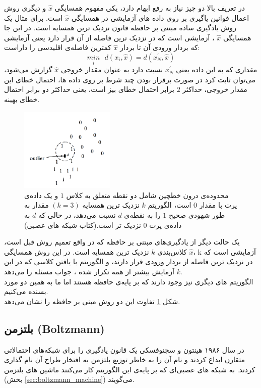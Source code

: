 \documentclass[11pt,a4paper,twocolumn]{article}
\begin{document}
در تعریف بالا دو چیز نیاز به رفع ابهام دارد، یکی مفهوم همسایگی
$\widehat x$
و دیگری روش اعمال قوانین یاگیری بر روی داده های آزمایشی در همسایگی
$\widehat x$
است. برای مثال یک روش یادگیری ساده مبتنی بر حافظه
قانون نزدیک ترین همسایه
است. در این جا همسایگی
$\widehat x$
، آزمایشی است که در نزدیک ترین فاصله از آن قرار دارد یعنی آزمایشی که بردار ورودی آن تا بردار
$\widehat x$
کمترین فاصله‌ی اقلیدسی را داراست:
$$\underset{i}{min} \text{ } d(x_i,\widehat x) = d(x_N^{'},\widehat x)$$
مقداری که به این داده یعنی
$x_N^{'}$
نسبت دارد به عنوان مقدار خروجی
$\widehat x$
گزارش می‌شود، می‌توان ثابت کرد در صورت برقرار بودن چند شرط بر روی داده ها، احتمال خطای این مقدار خروجی، حداکثر $2$ برابر احتمال خطای بیز است، یعنی حداکثر دو برابر احتمال خطای بهینه.
\begin{figure}
  \centering
    \includegraphics[width=0.4\textwidth]{Nearest.png}
  \caption{محدوده‌ی درون خطچین شامل دو نقطه متعلق به کلاس $1$ و یک داده‌ی پرت با مقدار $0$ است، الگوریتم $k$ نزدیک ترین همسایه $(k=3)$ مقدار  به طور شهودی صحیح $1$ را به نقطه‌ی $d$ نسبت می‌دهد، در حالی که $d$ به داده‌ی پرت $0$ نزدیک تر است.(کتاب شبکه های عصبی\cite[ص-55]{haykin}) }
  \label{fig:nearest}
\end{figure}

یک حالت دیگر از یادگیری‌های مبتنی بر حافظه که در واقع تعمیم روش قبل است، کلاس‌بندی $k$ نزدیک ترین همسایه است. در این روش همسایگی $\widehat x$، k آزمایشی است که در نزدیک ترین فاصله از بردار ورودی قرار دارند، و الگوریتم با یافتن کلاسی که در این $k$ آزمایش بیشتر از همه تکرار شده ، جواب مسئله را می‌دهد.\\


الگوریتم های دیگری نیز وجود دارند که بر پایه‌ی حافظه هستند اما ما به همین دو مورد بسنده می‌کنیم.\\

شکل \ref{fig:nearest} تفاوت این دو روش مبنی بر حافظه را نشان می‌دهد.

\subsection{بلتزمن (Boltzmann)}
\label{sec:boltzmann}
در سال ۱۹۸۶ هینتون و سجنوفسکی یک قانون یادگیری را برای شبکه‌های احتمالاتی متقارن ابداع کردند و نام آن را به خاطر توزیع بلتزمن به افتخار طراح آن نام گذاری کردند. به شبکه های عصبی‌ای که بر پایه‌ی این الگوریتم کار می‌کنند ماشین های بلتزمن (بخش 
\ref{sec:boltzmann_machine})
می‌گویند.
\end{document}

